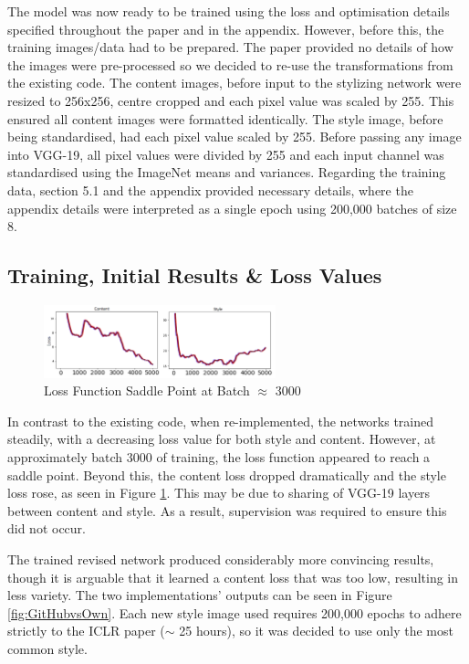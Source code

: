 \documentclass{article} %
\begin{document}
The model was now ready to be trained using the loss and optimisation details specified throughout the paper and in the appendix. However, before this, the training images/data had to be prepared. The paper provided no details of how the images were pre-processed so we decided to re-use the transformations from the existing code. The content images, before input to the stylizing network were resized to 256x256, centre cropped and each pixel value was scaled by 255. This ensured all content images were formatted identically. The style image, before being standardised, had each pixel value scaled by 255. Before passing any image into VGG-19, all pixel values were divided by 255 and each input channel was standardised using the ImageNet means and variances. Regarding the training data, section 5.1 and the appendix provided necessary details, where the appendix details were interpreted as a single epoch using 200,000 batches of size 8.

\subsection{Training, Initial Results \& Loss Values}

\begin{figure}[h!]
    \centering
    \vspace{-1mm}
    \includegraphics[width=0.6\textwidth]{Saddle.png}
    \vspace{-2mm}
    \caption{Loss Function Saddle Point at Batch $\approx$ 3000}
    \label{fig:loss_saddle}
    \vspace{-3mm}
\end{figure}

In contrast to the existing code, when re-implemented, the networks trained steadily, with a decreasing loss value for both style and content. However, at approximately batch 3000 of training, the loss function appeared to reach a saddle point. Beyond this, the content loss dropped dramatically and the style loss rose, as seen in Figure \ref{fig:loss_saddle}. This may be due to sharing of VGG-19 layers between content and style. As a result, supervision was required to ensure this did not occur.

The trained revised network produced considerably more convincing results, though it is arguable that it learned a content loss that was too low, resulting in less variety. The two implementations' outputs can be seen in Figure \ref{fig:GitHubvsOwn}. Each new style image used requires 200,000 epochs to adhere strictly to the ICLR paper ($\sim$ 25 hours), so it was decided to use only the most common style.
\end{document}
